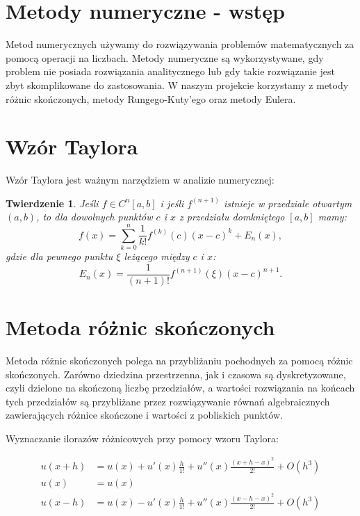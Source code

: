 \documentclass[a4paper,12pt]{article}
\newtheorem{theorem}{Twierdzenie}
\begin{document}
\section{Metody numeryczne - wstęp}
Metod numerycznych używamy do rozwiązywania problemów matematycznych za pomocą operacji na liczbach. Metody numeryczne są wykorzystywane, gdy problem nie posiada rozwiązania analitycznego lub gdy takie rozwiązanie jest zbyt skomplikowane do zastosowania. W naszym projekcie korzystamy z metody różnic skończonych, metody Rungego-Kuty'ego oraz metody Eulera.

\section{Wzór Taylora}
Wzór Taylora jest ważnym narzędziem w analizie numerycznej:
\begin{theorem}
Jeśli $f \in C^n [a,b]$ i jeśli $f^{(n+1)}$ istnieje w przedziale otwartym $(a,b)$, to dla dowolnych punktów $c$ i $x$ z przedziału domkniętego $[a,b]$ mamy:
\begin{equation}
f(x)=\sum_{k=0}^n \frac{1}{k!}f^{(k)}(c)(x-c)^k + E_n (x),
\end{equation}
gdzie dla pewnego punktu $\xi$ leżącego między $c$ i $x$:
\begin{equation}
E_n (x) = \frac{1}{(n+1)!}f^{(n+1)}(\xi)(x-c)^{n+1}.
\end{equation}
\end{theorem}

\section{Metoda różnic skończonych}
Metoda różnic skończonych polega na przybliżaniu pochodnych za pomocą różnic skończonych. Zarówno dziedzina przestrzenna, jak i czasowa są dyskretyzowane, czyli dzielone na skończoną liczbę przedziałów, a wartości rozwiązania na końcach tych przedziałów są przybliżane przez rozwiązywanie równań algebraicznych zawierających różnice skończone i wartości z pobliskich punktów.

Wyznaczanie ilorazów różnicowych przy pomocy wzoru Taylora:

\begin{align*}
    u(x+h) &= u(x) + u'(x) \frac{h}{1!} + u''(x) \frac{(x+h-x)^2}{2!} + O(h^3) \\
    u(x) &= u(x) \\
    u(x-h) &= u(x) - u'(x) \frac{h}{1!} + u''(x) \frac{(x-h-x)^2}{2!} + O(h^3)
\end{align*}
\end{document}
